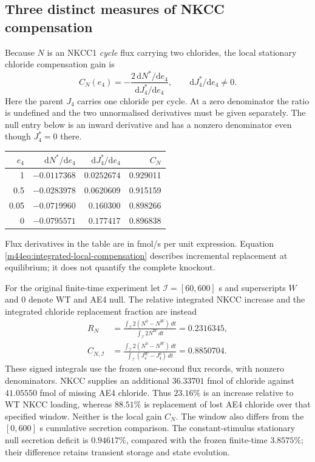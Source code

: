 \subsection{Three distinct measures of NKCC compensation}
Because $N$ is an NKCC1 \emph{cycle} flux carrying two chlorides, the local
stationary chloride compensation gain is
\begin{equation}
 C_N(e_4)=-\frac{2\,\mathrm dN^*/\mathrm de_4}
                  {\mathrm dJ_4^*/\mathrm de_4},
 \qquad \mathrm dJ_4^*/\mathrm de_4\ne0.
 \label{m44eq:integrated-local-compensation}
\end{equation}
Here the parent $J_4$ carries one chloride per cycle. At a zero denominator
the ratio is undefined and the two unnormalised derivatives must be given
separately. The null entry below is an inward derivative and has a nonzero
denominator even though $J_4^*=0$ there.
\begin{center}
\begin{tabular}{rrrr}\hline
$e_4$ & $\mathrm dN^*/\mathrm de_4$ & $\mathrm dJ_4^*/\mathrm de_4$ & $C_N$\\\hline
1 & $-0.0117368$ & $0.0252674$ & 0.929011\\
0.5 & $-0.0283978$ & $0.0620609$ & 0.915159\\
0.05 & $-0.0719960$ & $0.160300$ & 0.898266\\
0 & $-0.0795571$ & $0.177417$ & 0.896838\\\hline
\end{tabular}
\end{center}
Flux derivatives in the table are in fmol/s per unit expression.
Equation \eqref{m44eq:integrated-local-compensation} describes incremental
replacement at equilibrium; it does not quantify the complete knockout.

For the original finite-time experiment let $\mathcal I=[60,600]$ s and
superscripts $W$ and $0$ denote WT and AE4 null. The relative integrated
NKCC increase and the integrated chloride replacement fraction are instead
\begin{align*}
 R_N&=\frac{\int_{\mathcal I}2(N^0-N^W)\,dt}
             {\int_{\mathcal I}2N^W\,dt}=0.2316345,\\
 C_{N,\mathcal I}&=
 \frac{\int_{\mathcal I}2(N^0-N^W)\,dt}
      {\int_{\mathcal I}(J_4^W-J_4^0)\,dt}=0.8850704.
\end{align*}
These signed integrals use the frozen one-second flux records, with nonzero
denominators. NKCC supplies an additional $36.33701$ fmol of chloride
against $41.05550$ fmol of missing AE4 chloride. Thus $23.16\%$ is an
increase relative to WT NKCC loading, whereas $88.51\%$ is replacement of
lost AE4 chloride over that specified window. Neither is the local gain
$C_N$. The window also differs from the $[0,600]$ s cumulative secretion
comparison. The constant-stimulus stationary null secretion deficit is
$0.94617\%$, compared with the frozen finite-time $3.8575\%$; their
difference retains transient storage and state evolution.

